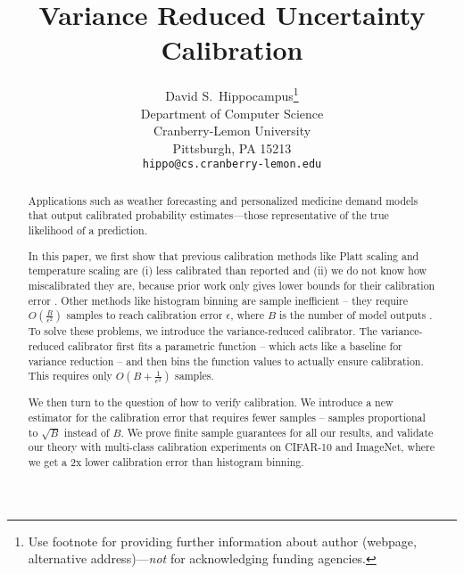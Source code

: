 \documentclass{article}
\title{Variance Reduced Uncertainty Calibration}
\author{%
  David S.~Hippocampus\thanks{Use footnote for providing further information
    about author (webpage, alternative address)---\emph{not} for acknowledging
    funding agencies.} \\
  Department of Computer Science\\
  Cranberry-Lemon University\\
  Pittsburgh, PA 15213 \\
  \texttt{hippo@cs.cranberry-lemon.edu} \\
}
\newcommand{\pl}[1]{}
\begin{document}
\maketitle

\begin{abstract}
Applications such as weather forecasting and personalized medicine demand models that output calibrated probability estimates---those representative of the true likelihood of a prediction.
  \pl{say: Scaling methods fit a parametric model are great, because requires $O(1/\epsilon^2)$ samples, but we find in this work that...}
In this paper, we first show that previous calibration methods like Platt scaling and temperature scaling are (i) less calibrated than reported and (ii) we do not know how miscalibrated they are, because prior work only gives lower bounds for their calibration error \pl{reframe this: previous work (possibly some of our reviewers) did not think they were giving lower bounds; should say instead that methods used by previous work to assess calibration underestimate the true calibration error}.
  Other methods \pl{what other methods?} like histogram binning are sample inefficient -- they require $O(\frac{B}{\epsilon^2})$ samples to reach calibration error $\epsilon$, where $B$ is the number of model outputs \pl{be clear: which model? this looks like you're talking about number of classes; which is coincidentally what you want, I guess!}. To solve these problems, we introduce the variance-reduced calibrator.
  The variance-reduced calibrator first fits a parametric function -- which acts like a baseline for variance reduction -- and then bins the function values to actually ensure calibration. This requires only $O(B + \frac{1}{\epsilon^2})$ samples. \pl{we can join some sentences to make it flow better}
  \pl{compress: We also introduce a new estimator for verifying...}
  We then turn to the question of how to verify calibration. We introduce a new estimator for the calibration error that requires fewer samples -- samples proportional to $\sqrt{B}$ instead of $B$. We prove finite sample guarantees for all our results, and validate our theory with multi-class calibration experiments on CIFAR-10 and ImageNet, where we get a 2x lower calibration error than histogram binning. \pl{and guarantees on true calibration unlike scaling methods}
\end{abstract}

\pl{Writing tip: find ways to group statements into single sentences so that you get some hierarchical structure:
each sentence should express a set of related ideas, and important ideas are at the beginning of sentences}
\end{document}
